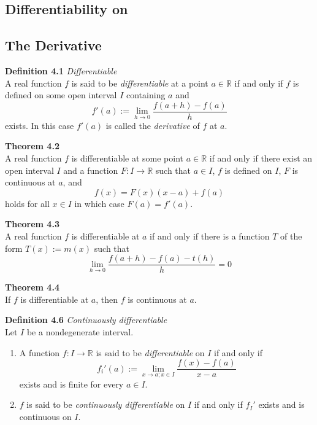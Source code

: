 \documentclass[8pt,landscape]{article}
\begin{document}
\begin{multicols}{3}
    \section{Differentiability on }

    \subsection{The Derivative}

    \textbf{Definition 4.1} \emph{Differentiable} \\
    A real function $f$ is said to be \emph{differentiable} at a point $a \in \mathbb{R}$
    if and only if $f$ is defined on some open interval $I$ containing $a$ and
    \[
        f'(a) := \lim_{h \to 0} \frac{f(a+h) - f(a)}{h}
    \]
    exists.
    In this case $f'(a)$ is called the \emph{derivative} of $f$ at $a$.

    \textbf{Theorem 4.2} \\
    A real function $f$ is differentiable at some point $a \in \mathbb{R}$ if and only if
    there exist an open interval $I$ and a function $F : I \to \mathbb{R}$ such that
    $a \in I$, $f$ is defined on $I$, $F$ is continuous at $a$, and
    \[
        f(x) = F(x) (x-a) + f(a)
    \]
    holds for all $x \in I$ in which case $F(a) = f'(a)$.

    \textbf{Theorem 4.3} \\
    A real function $f$ is differentiable at $a$ if and only if there is a function
    $T$ of the form $T(x) := m(x)$ such that
    \[
        \lim_{h \to 0} \frac{f(a+h) - f(a) - t(h)}{h} = 0
    \]

    \textbf{Theorem 4.4} \\
    If $f$ is differentiable at $a$, then $f$ is continuous at $a$.

    \textbf{Definition 4.6} \emph{Continuously differentiable} \\
    Let $I$ be a nondegenerate interval.
    \begin{enumerate}
        \item A function $f : I \to \mathbb{R}$ is said to be \emph{differentiable}
            on $I$ if and only if
            \[
                f_i'(a) := \lim_{x \to a; x \in I} \frac{f(x) - f(a)}{x-a}
            \]
            exists and is finite for every $a \in I$.
        \item $f$ is said to be \emph{continuously differentiable} on $I$ if and only if
            $f_I'$ exists and is continuous on $I$.
    \end{enumerate}


\end{multicols}
\end{document}
